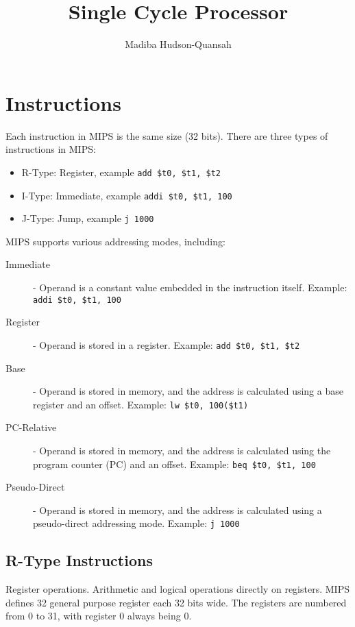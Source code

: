 \documentclass[12pt letter]{report}
\title{\Huge{Single Cycle Processor}}
\author{\huge{Madiba Hudson-Quansah}}
\date{}
\begin{document}
\maketitle
\newpage
{}
\tableofcontents
\pagebreak

\chapter{Instructions}

Each instruction in MIPS is the same size (32 bits). There are three types of instructions in MIPS:
\begin{itemize}
  \item R-Type: Register, example \texttt{add \$t0, \$t1, \$t2}
  \item I-Type: Immediate, example \texttt{addi \$t0, \$t1, 100}
  \item J-Type: Jump, example \texttt{j 1000}
\end{itemize}

MIPS supports various addressing modes, including:
\begin{description}
  \item[Immediate] - Operand is a constant value embedded in the instruction itself. Example: \texttt{addi \$t0, \$t1, 100}
  \item[Register] - Operand is stored in a register. Example: \texttt{add \$t0, \$t1, \$t2}
  \item[Base] - Operand is stored in memory, and the address is calculated using a base register and an offset. Example: \texttt{lw \$t0, 100(\$t1)}
  \item[PC-Relative] - Operand is stored in memory, and the address is calculated using the program counter (PC) and an offset. Example: \texttt{beq \$t0, \$t1, 100}
  \item[Pseudo-Direct] - Operand is stored in memory, and the address is calculated using a pseudo-direct addressing mode. Example: \texttt{j 1000}
\end{description}

\section{R-Type Instructions}

Register operations. Arithmetic and logical operations directly on registers. MIPS defines 32 general purpose register each 32 bits wide. The registers are numbered from 0 to 31, with register 0 always being 0.
\end{document}
